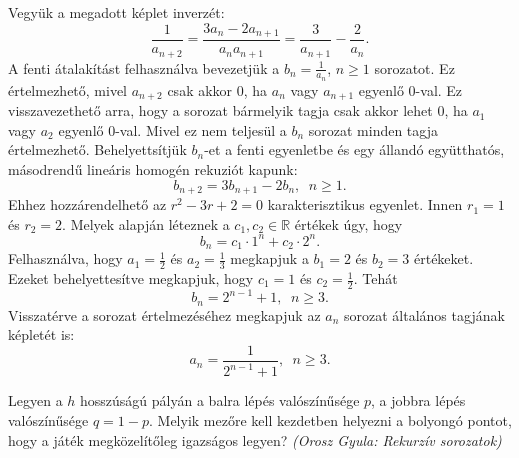 \begin{solution}
Vegyük a megadott képlet inverzét: 
\[
\frac{1}{a_{n+2}}=\frac{3a_{n}-2a_{n+1}}{a_{n}a_{n+1}}=\frac{3}{a_{n+1}}-\frac{2}{a_{n}}.
\]
A fenti átalakítást felhasználva bevezetjük a $b_{n}=\frac{1}{a_{n}}$,
$n\geq1$ sorozatot. Ez értelmezhető, mivel $a_{n+2}$ csak akkor
0, ha $a_{n}$ vagy $a_{n+1}$ egyenlő 0-val. Ez visszavezethető arra,
hogy a sorozat bármelyik tagja csak akkor lehet 0, ha $a_{1}$ vagy
$a_{2}$ egyenlő 0-val. Mivel ez nem teljesül a $b_{n}$ sorozat minden
tagja értelmezhető. Behelyettsítjük $b_{n}$-et a fenti egyenletbe
és egy állandó együtthatós, másodrendű lineáris homogén rekuziót kapunk:
\[
b_{n+2}=3b_{n+1}-2b_{n},\phantom{a}n\geq1.
\]
Ehhez hozzárendelhető az $r^{2}-3r+2=0$ karakterisztikus egyenlet.
Innen $r_{1}=1$ és $r_{2}=2$. Melyek alapján léteznek a $c_{1},c_{2}\in\mathbb{R}$
értékek úgy, hogy 
\[
b_{n}=c_{1}\cdot1^{n}+c_{2}\cdot2^{n}.
\]
Felhasználva, hogy $a_{1}=\frac{1}{2}$ és $a_{2}=\frac{1}{3}$ megkapjuk
a $b_{1}=2$ és $b_{2}=3$ értékeket. Ezeket behelyettesítve megkapjuk,
hogy $c_{1}=1$ és $c_{2}=\frac{1}{2}$. Tehát 
\[
b_{n}=2^{n-1}+1,\phantom{a}n\geq3.
\]
Visszatérve a sorozat értelmezéséhez megkapjuk az $a_{n}$ sorozat
általános tagjának képletét is: 
\[
a_{n}=\frac{1}{2^{n-1}+1},\phantom{a}n\geq3.
\]
\end{solution}
\begin{extraproblem}
 Legyen a $h$ hosszúságú pályán a balra lépés valószínűsége $p$,
a jobbra lépés valószínűsége $q=1-p$. Melyik mezőre kell kezdetben
helyezni a bolyongó pontot, hogy a játék megközelítőleg igazságos
legyen? \emph{(Orosz Gyula: Rekurzív sorozatok)}
\end{extraproblem}

